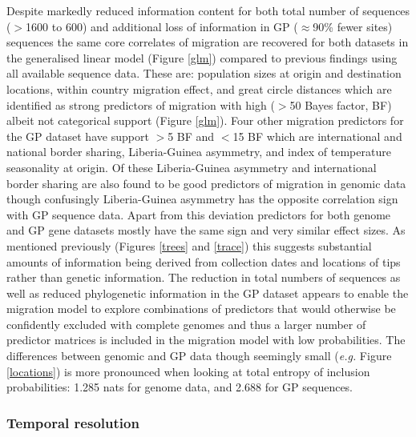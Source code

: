 \documentclass{bmcart}
\begin{document}
Despite markedly reduced information content for both total number of sequences ($>$1600 to 600) and additional loss of information in GP ($\approx$90\% fewer sites) sequences the same core correlates of migration are recovered for both datasets in the generalised linear model (Figure \ref{glm}) compared to previous findings using all available sequence data.
These are: population sizes at origin and destination locations, within country migration effect, and great circle distances which are identified as strong predictors of migration with high ($>$50 Bayes factor, BF) albeit not categorical support (Figure \ref{glm}).
Four other migration predictors for the GP dataset have support $>$5 BF and $<$15 BF which are international and national border sharing, Liberia-Guinea asymmetry, and index of temperature seasonality at origin.
Of these Liberia-Guinea asymmetry and international border sharing are also found to be good predictors of migration in genomic data though confusingly Liberia-Guinea asymmetry has the opposite correlation sign with GP sequence data.
Apart from this deviation predictors for both genome and GP gene datasets mostly have the same sign and very similar effect sizes.
As mentioned previously (Figures \ref{trees} and \ref{trace}) this suggests substantial amounts of information being derived from collection dates and locations of tips rather than genetic information.
The reduction in total numbers of sequences as well as reduced phylogenetic information in the GP dataset appears to enable the migration model to explore combinations of predictors that would otherwise be confidently excluded with complete genomes and thus a larger number of predictor matrices is included in the migration model with low probabilities.
The differences between genomic and GP data though seemingly small (\textit{e.g.} Figure \ref{locations}) is more pronounced when looking at total entropy of inclusion probabilities: 1.285 nats for genome data, and 2.688 for GP sequences.


\subsubsection*{Temporal resolution}
\end{document}
